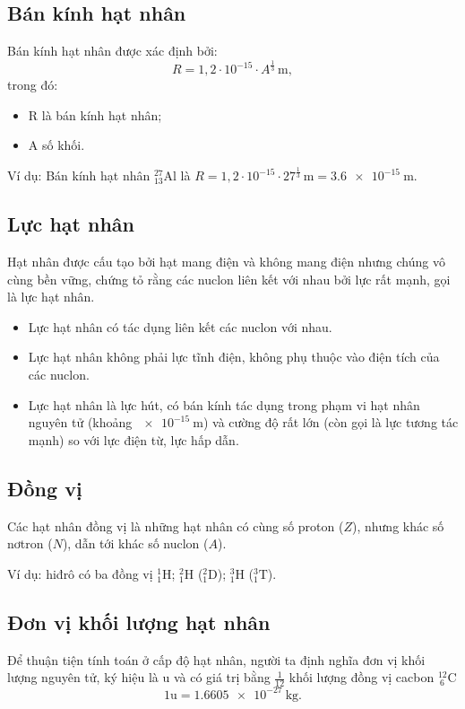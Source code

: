 \subsection{Bán kính hạt nhân}
Bán kính hạt nhân được xác định bởi:
\begin{equation}
R=1,2\cdot 10^{-15} \cdot A^{\frac{1}{3}}\, \text{m},
\end{equation}
trong đó:
\begin{itemize}
	\item R là bán kính hạt nhân;
	\item A số khối.
\end{itemize}
Ví dụ: Bán kính hạt nhân $^{27}_{13}\text{Al}$ là $R=1,2\cdot 10^{-15} \cdot 27^{\frac{1}{3}}\, \text{m}=\SI{3,6e-15}{\meter}$.

\subsection{Lực hạt nhân}
Hạt nhân được cấu tạo bởi hạt mang điện và không mang điện nhưng chúng vô cùng bền vững,
chứng tỏ rằng các nuclon liên kết với nhau bởi lực rất mạnh, gọi là lực hạt nhân.
\begin{itemize}
	\item Lực hạt nhân có tác dụng liên kết các nuclon với nhau.
	\item Lực hạt nhân không phải lực tĩnh điện, không phụ thuộc vào điện tích của các nuclon.
	\item Lực hạt nhân là lực hút, có bán kính tác dụng trong phạm vi hạt nhân nguyên tử (khoảng $\SI{e-15}{\meter}$) và cường độ rất lớn (còn gọi là lực tương tác mạnh) so với lực điện từ, lực hấp dẫn.
\end{itemize}

\subsection{Đồng vị}
Các hạt nhân đồng vị là những hạt nhân có cùng số proton ($Z$), nhưng khác số nơtron ($N$), dẫn tới khác số nuclon ($A$).

Ví dụ: hiđrô có ba đồng vị $^1_1\text{H}$; $^2_1\text{H}$ ($^2_1\text{D}$); $^3_1\text{H}$ ($^3_1\text{T}$).

\subsection{Đơn vị khối lượng hạt nhân}
Để thuận tiện tính toán ở cấp độ hạt nhân, người ta định nghĩa đơn vị khối lượng nguyên tử, ký hiệu là u và có giá trị bằng $\frac{1}{12}$ khối lượng đồng vị cacbon $^{12}_{\ 6}\text{C}$
\begin{equation}
1\text{u}=\SI{1,6605e-27}{\kilogram}.
\end{equation}
